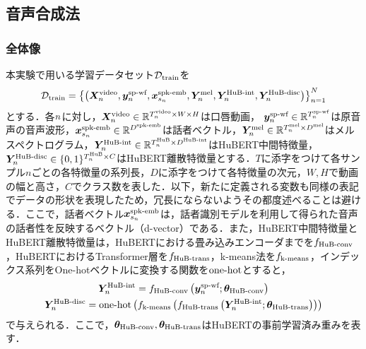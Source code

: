 \subsection{音声合成法}
\subsubsection{全体像}
本実験で用いる学習データセット$\datasetTrain$を
\begin{equation}
    \datasetTrain = \lrc{\lr{\video, \spWaveformGt, \spkEmb, \melGt, \hubertIntGt, \hubertDiscGt}}_{\numLower = 1}^{\numUpper}
\end{equation}
とする．各$\numLower$に対し，$\video \in \videoSet$は口唇動画， $\spWaveformGt \in \spWaveformSet$は原音声の音声波形，$\spkEmb \in \spkEmbSet$は話者ベクトル，$\melGt \in \melSet$はメルスペクトログラム，$\hubertIntGt \in \hubertIntSet$はHuBERT中間特徴量，$\hubertDiscGt \in \hubertDiscGtSet$はHuBERT離散特徴量とする．$T$に添字をつけて各サンプル$n$ごとの各特徴量の系列長，$D$に添字をつけて各特徴量の次元，$W, H$で動画の幅と高さ，$C$でクラス数を表した．以下，新たに定義される変数も同様の表記でデータの形状を表現したため，冗長にならないようその都度述べることは避ける．ここで，話者ベクトル$\spkEmb$は，話者識別モデル\cite{wan2018generalized}を利用して得られた音声の話者性を反映するベクトル（d-vector）である．また，HuBERT中間特徴量とHuBERT離散特徴量は，HuBERTにおける畳み込みエンコーダまでを$\hubertConv$，HuBERTにおけるTransformer層を$\hubertTransformer$，k-means法を$\kmeans$，インデックス系列をOne-hotベクトルに変換する関数を$\onehot$とすると，
\begin{gather}
    \hubertIntGt = \hubertConv\lr{\spWaveformGt; \weightHuBERTConv} \\
    \hubertDiscGt = \onehot\lr{\kmeans\lr{\hubertTransformer\lr{\hubertIntGt; \weightHuBERTTrans}}}
\end{gather}
で与えられる．ここで，$\weightHuBERTConv, \weightHuBERTTrans$はHuBERTの事前学習済み重みを表す．

